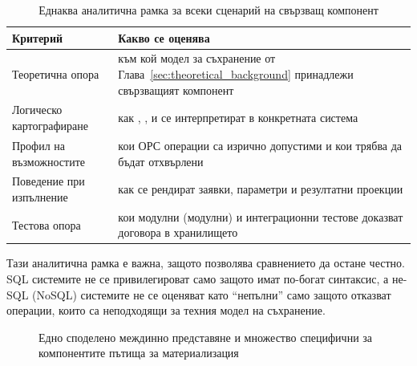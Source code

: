 \begin{table}[H]
\centering
\small
\caption{Еднаква аналитична рамка за всеки сценарий на свързващ компонент}
\label{tab:backend_analysis_framework}
\begin{tabularx}{\textwidth}{L{3.3cm}Y}
\toprule
\textbf{Критерий} & \textbf{Какво се оценява} \\
\midrule
Теоретична опора & към кой модел за съхранение от Глава~\ref{sec:theoretical_background} принадлежи свързващият компонент \\
Логическо картографиране & как , ,  и  се интерпретират в конкретната система \\
Профил на възможностите & кои ОРС операции са изрично допустими и кои трябва да бъдат отхвърлени \\
Поведение при изпълнение & как се рендират заявки, параметри и резултатни проекции \\
Тестова опора & кои модулни (модулни) и интеграционни тестове доказват договора в хранилището \\
\bottomrule
\end{tabularx}
\end{table}

Тази аналитична рамка е важна, защото позволява сравнението да остане честно. SQL системите не се привилегироват само защото имат по-богат синтаксис, а не-SQL (NoSQL) системите не се оценяват като ``непълни'' само защото отказват операции, които са неподходящи за техния модел на съхранение.

\begin{figure}[H]
\centering
{}
\caption{Едно споделено междинно представяне и множество специфични за компонентите пътища за материализация}
\label{fig:backend_materialisation_paths}
\end{figure}

